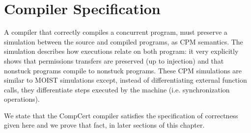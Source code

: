 \section{Compiler Specification \label{sec:compilerthm}}

A compiler that correctly compiles a concurrent program, must preserve a simulation between the source and compiled programs, as CPM semantics. The simulation describes how executions relate on both program: it very explicitly shows that permissions transfers are preserved (up to injection) and that nonstuck programs compile to nonstuck programs. These CPM simulations are similar to MOIST simulations except, instead of differentiating external function calls, they differentiate steps executed by the machine (i.e. synchronization operations).

We state that the CompCert compiler satisfies the specification of correctness given here and we prove that fact, in later sections of this chapter.   

